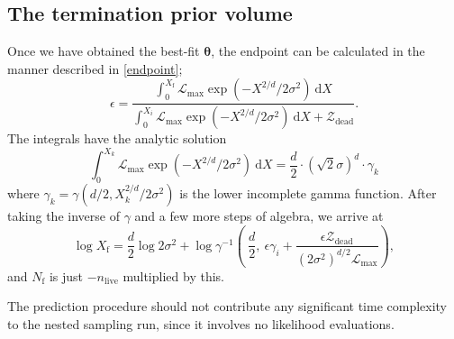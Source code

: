 \documentclass[usenatbib]{mnras}
\newcommand{\thetab}{\bm{\theta}}
\newcommand{\nlive}{n_\mathrm{live}}
\newcommand{\Like}{\mathcal{L}}
\begin{document}
\subsection{The termination prior volume}
Once we have obtained the best-fit $\thetab$, the endpoint can be calculated in the manner described in \cref{endpoint};
\begin{equation}
	\epsilon = \frac{\int_0^{X_\mathrm{f}} \Like_\mathrm{max} \exp\left(-X^{2/d}/2\sigma^2\right)\ \mathrm{d}X}{\int_0^{X_i} \Like_\mathrm{max} \exp\left(-X^{2/d}/2\sigma^2\right)\ \mathrm{d}X + \mathcal{Z}_\mathrm{dead}}.
\end{equation}
The integrals have the analytic solution
\begin{equation}
	\int_0^{X_k} \Like_\mathrm{max} \exp\left(-X^{2/d}/2\sigma^2\right)\ \mathrm{d}X = \frac{d}{2} \cdot \left(\sqrt{2}\sigma\right)^d \cdot \gamma_k
\end{equation}
where $\gamma_k = \gamma\left(d/2, X_k^{2/d}/2\sigma^2\right)$ is the lower incomplete gamma function. After taking the inverse of  $\gamma$ and a few more steps of algebra, we arrive at
\begin{equation}
	\log X_\mathrm{f} = \frac{d}{2}\log 2\sigma^2	+ \log \gamma^{-1} \left(\ \frac{d}{2} ,\ \epsilon \gamma_i+ \frac{\epsilon\mathcal{Z}_\mathrm{dead}}{ \left( 2\sigma^2 \right)^{d/2}\Like_\mathrm{max}}\right),
\end{equation}
and $N_\mathrm{f}$ is just  $-\nlive$ multiplied by this.
\par
The prediction procedure should not contribute any significant time complexity to the nested sampling run, since it involves no likelihood evaluations.
\end{document}
